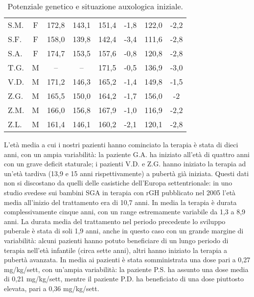 \begin{table}[!h]
\begin{center}
\begin{tabular}{lccccccc}
S.M.	& F & 172,8 & 143,1 & 151,4 & -1,8 	        	& 122,0 & -2,2  \\
S.F.	& F & 158,0 & 139,8 & 142,4 & -3,4 	  		& 111,6 & -2,8  \\
S.A.	& F & 174,7 & 153,5 & 157,6 & -0,8 	  		& 120,8 & -2,8  \\
T.G.    & M & --    & --    & 171,5 & -0,5    			& 136,9 & -3,0  \\
V.D.	& M & 171,2 & 146,3 & 165,2 & -1,4 	  		& 149,8 & -1,5  \\
Z.G.	& M & 165,5 & 150,0 & 164,2 & -1,7 	  		& 156,0 & -2     \\
Z.M.	& M & 166,0 & 156,8 & 167,9 & -1,0 	  		& 116,9 & -2,2  \\
Z.L.	& M & 161,4 & 146,1 & 160,2 & -2,1 	  		& 120,1 & -2,8  \\
\bottomrule
\end{tabular}
\end{center}
\caption{Potenziale genetico e situazione auxologica iniziale.}
\label{tab:SituazioneIniziale}
\end{table}

L'età media a cui i nostri pazienti hanno cominciato la terapia è stata di dieci anni, con un ampia variabilità: la paziente G.A. ha iniziato all'età di quattro anni con un grave deficit staturale; i pazienti V.D. e Z.G. hanno iniziato la terapia ad un'età tardiva (13,9 e 15 anni rispettivamente) a pubertà già iniziata. Questi dati non si discostano da quelli delle casistiche dell'Europa settentrionale: in uno studio svedese sui bambini SGA in terapia con rGH pubblicato nel 2005 l'età media all'inizio del trattamento era di 10,7 anni\cite{dahlgren2005final}.
In media la terapia è durata complessivamente cinque anni, con un range estremamente variabile da 1,3 a 8,9 anni. La durata media del trattamento nel periodo precedente lo sviluppo puberale è stata di soli 1,9 anni, anche in questo caso con un grande margine di variabilità: alcuni pazienti hanno potuto beneficiare di un lungo periodo di terapia nell'età infantile (circa sette anni), altri hanno iniziato la terapia a pubertà avanzata. In media ai pazienti è stata somministrata una dose pari a 0,27 mg/kg/sett, con un'ampia variabilità: la paziente P.S. ha assunto una dose media di 0,21 mg/kg/sett, mentre il paziente P.D. ha beneficiato di una dose piuttosto elevata, pari a 0,36 mg/kg/sett. 
  

